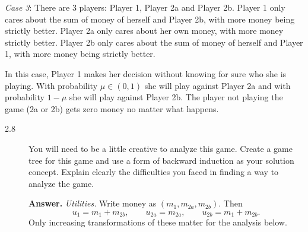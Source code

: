 \documentclass[11pt]{article}
\newenvironment{solution}{\par\smallskip\noindent\textbf{Answer.} }{\par\medskip}
\begin{document}
\emph{Case 3}: There are 3 players: Player 1, Player 2a and Player 2b. Player 1 only cares about the sum of money of herself and Player 2b, with more money being strictly better. Player 2a only cares about her own money, with more money strictly better. Player 2b only cares about the sum of money of herself and Player 1, with more money being strictly better.

In this case, Player 1 makes her decision without knowing for sure who she is playing. With probability $\mu\in(0,1)$ she will play against Player 2a and with probability $1-\mu$ she will play against Player 2b. The player not playing the game (2a or 2b) gets zero money no matter what happens.

\begin{description}
\item[2.8] You will need to be a little creative to analyze this game. Create a game tree for this game and use a form of backward induction as your solution concept. Explain clearly the difficulties you faced in finding a way to analyze the game.
\begin{solution}
\emph{Utilities.} Write money as $(m_1,m_{2a},m_{2b})$. Then
\[
u_1=m_1+m_{2b},\qquad u_{2a}=m_{2a},\qquad u_{2b}=m_1+m_{2b}.
\]
Only increasing transformations of these matter for the analysis below.


\end{solution}
\end{description}
\end{document}
